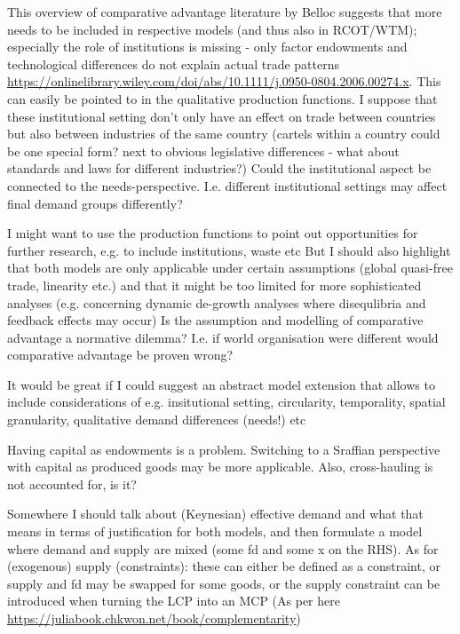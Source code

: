 \documentclass{article}
\begin{document}
\begin{refsection}
This overview of comparative advantage literature by Belloc suggests that more needs to be included in respective models (and thus also in RCOT/WTM); especially the role of institutions is missing - only factor endowments and technological differences do not explain actual trade patterns \url{https://onlinelibrary.wiley.com/doi/abs/10.1111/j.0950-0804.2006.00274.x}. This can easily be pointed to in the qualitative production functions.
I suppose that these institutional setting don't only have an effect on trade between countries but also between industries of the same country (cartels within a country could be one special form? next to obvious legislative differences - what about standards and laws for different industries?)
Could the institutional aspect be connected to the needs-perspective. I.e. different institutional settings may affect final demand groups differently?

I might want to use the production functions to point out opportunities for further research, e.g. to include institutions, waste etc
But I should also highlight that both models are only applicable under certain assumptions (global quasi-free trade, linearity etc.) and that it might be too limited for more sophisticated analyses (e.g. concerning dynamic de-growth analyses where disequlibria and feedback effects may occur)
Is the assumption and modelling of comparative advantage a normative dilemma? I.e. if world organisation were different would comparative advantage be proven wrong?

It would be great if I could suggest an abstract model extension that allows to include considerations of e.g. insitutional setting, circularity, temporality, spatial granularity, qualitative demand differences (needs!) etc

Having capital as endowments is a problem. Switching to a Sraffian perspective with capital as produced goods may be more applicable.
Also, cross-hauling is not accounted for, is it?

Somewhere I should talk about (Keynesian) effective demand and what that means in terms of justification for both models, and then formulate a model where demand and supply are mixed (some fd and some x on the RHS).
As for (exogenous) supply (constraints): these can either be defined as a constraint, or supply and fd may be swapped for some goods, or the supply constraint can be introduced when turning the LCP into an MCP (As per here \url{https://juliabook.chkwon.net/book/complementarity})


\end{refsection}
\end{document}
